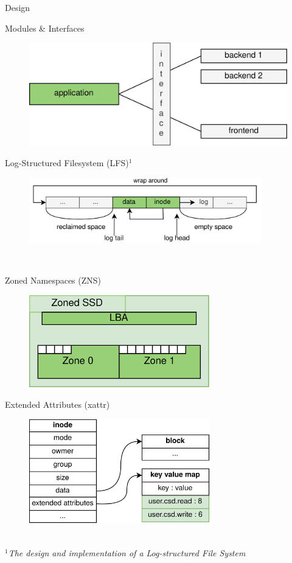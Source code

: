 \documentclass{beamer}
\newcommand\FourQuad[4]{%
    \begin{minipage}[b][.35\textheight][t]{.47\textwidth}#1\end{minipage}\hfill%
    \begin{minipage}[b][.35\textheight][t]{.47\textwidth}#2\end{minipage}\\[0.5em]
    \begin{minipage}[b][.35\textheight][t]{.47\textwidth}#3\end{minipage}\hfill
    \begin{minipage}[b][.35\textheight][t]{.47\textwidth}#4\end{minipage}%
}
\begin{document}
% 
\begin{frame}{Design}
	\begingroup
	\small
	
	\FourQuad%
		{\centering Modules \& Interfaces
		\begin{figure}
			\centering
			\includegraphics[width=1.0\textwidth]{resources/images/modules-interfaces.png}
		\end{figure}
		}
		{\centering Log-Structured Filesystem (LFS)$^1$
		\begin{figure}
			\centering
			\includegraphics[width=0.9\textwidth]{resources/images/lfs-example.png}
		\end{figure}
		}
		{\centering Zoned Namespaces (ZNS)
		\begin{figure}
			\centering
			\includegraphics[width=0.7\textwidth]{resources/images/zns-simple.png}
		\end{figure}
		}
		{\centering Extended Attributes (xattr)
		\begin{figure}
			\centering
			\includegraphics[width=0.7\textwidth]{resources/images/xattr-inode.png}
		\end{figure}
		}
		\\
		\textit{\tiny $^{1}$The design and implementation of a Log-structured File System \\}
	\endgroup
\end{frame}
\end{document}

